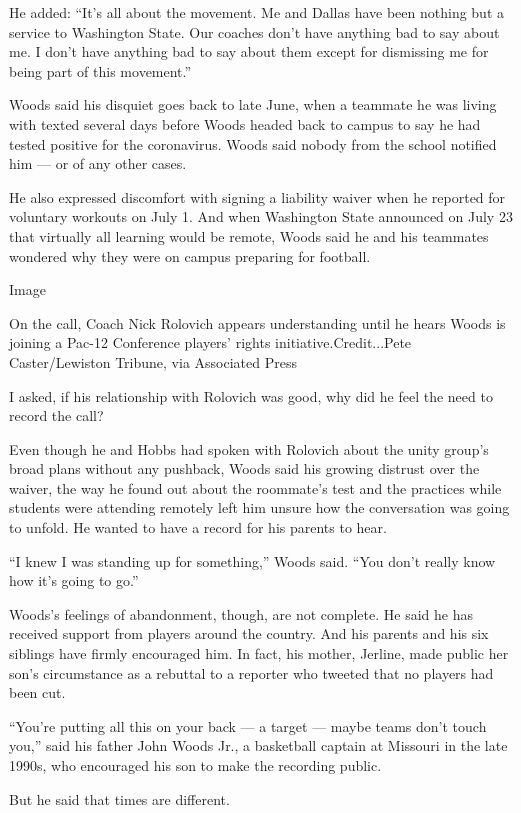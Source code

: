 He added: ``It's all about the movement. Me and Dallas have been nothing
but a service to Washington State. Our coaches don't have anything bad
to say about me. I don't have anything bad to say about them except for
dismissing me for being part of this movement.''

Woods said his disquiet goes back to late June, when a teammate he was
living with texted several days before Woods headed back to campus to
say he had tested positive for the coronavirus. Woods said nobody from
the school notified him --- or of any other cases.

He also expressed discomfort with signing a liability waiver when he
reported for voluntary workouts on July 1. And when Washington State
announced on July 23 that virtually all learning would be remote, Woods
said he and his teammates wondered why they were on campus preparing for
football.

Image

On the call, Coach Nick Rolovich appears understanding until he hears
Woods is joining a Pac-12 Conference players' rights
initiative.Credit...Pete Caster/Lewiston Tribune, via Associated Press

I asked, if his relationship with Rolovich was good, why did he feel the
need to record the call?

Even though he and Hobbs had spoken with Rolovich about the unity
group's broad plans without any pushback, Woods said his growing
distrust over the waiver, the way he found out about the roommate's test
and the practices while students were attending remotely left him unsure
how the conversation was going to unfold. He wanted to have a record for
his parents to hear.

``I knew I was standing up for something,'' Woods said. ``You don't
really know how it's going to go.''

Woods's feelings of abandonment, though, are not complete. He said he
has received support from players around the country. And his parents
and his six siblings have firmly encouraged him. In fact, his mother,
Jerline, made public her son's circumstance as a rebuttal to a reporter
who tweeted that no players had been cut.

``You're putting all this on your back --- a target --- maybe teams
don't touch you,'' said his father John Woods Jr., a basketball captain
at Missouri in the late 1990s, who encouraged his son to make the
recording public.

But he said that times are different.

